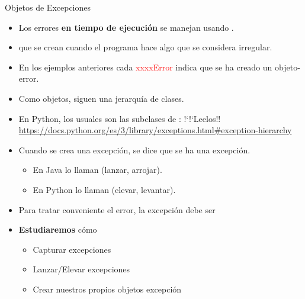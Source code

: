\documentclass[10pt, envcountsect , spanish]{beamer}
\begin{document}
\begin{frame}[fragile]{Objetos de Excepciones} 

\begin{itemize}

\item Los errores \textbf{en tiempo de ejecución} se manejan usando .

\item {} que se crean cuando el programa hace algo que se considera irregular.

\item En los ejemplos anteriores cada  \textcolor{red}{xxxxError} indica que se ha creado un objeto-error.

\item Como objetos, siguen una jerarquía de clases. 

\item En Python, los usuales son las subclases de : !`!`Leelos!!  \\
\url{https://docs.python.org/es/3/library/exceptions.html#exception-hierarchy}

\item Cuando se crea una excepción, se dice que se ha  una excepción.

\begin{itemize}
\item En Java lo llaman  (lanzar, arrojar). 
\item En Python lo llaman  (elevar, levantar).
\end{itemize}


\item Para tratar conveniente el error, la excepción debe ser 

\item \textbf{Estudiaremos} cómo 
\begin{itemize}
\item Capturar excepciones
\item Lanzar/Elevar excepciones
\item Crear nuestros propios objetos excepción
\end{itemize}

\end{itemize}
\end{frame}
\end{document}
